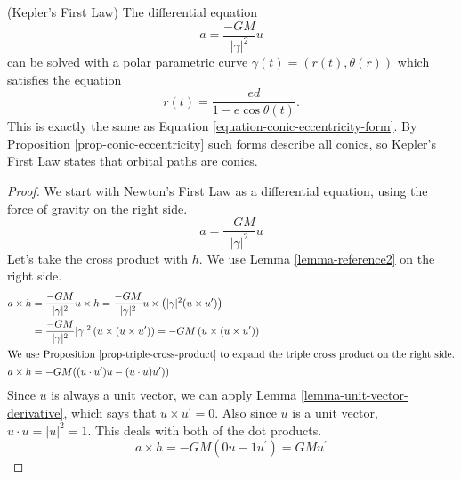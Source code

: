 \documentclass[fleqn,letterpaper]{report}
\begin{document}
\begin{prop}
(Kepler's First Law) The differential equation 
\begin{equation*}
a = \frac{-GM}{|\gamma|^2} u 
\end{equation*}
can be solved with a polar parametric curve $\gamma(t) =
(r(t),\theta(r))$ which satisfies the equation
\begin{equation*}
r(t) = \frac{ed}{1 - e \cos \theta(t)}.
\end{equation*}
This is exactly the same as Equation
\ref{equation-conic-eccentricity-form}. By Proposition
\ref{prop-conic-eccentricity} such forms describe all conics, so
Kepler's First Law states that orbital paths are conics. 
\end{prop}

\begin{proof}
We start with Newton's First Law as a differential equation,
using the force of gravity on the right side. 
\begin{equation*}
a = \frac{-GM}{|\gamma|^2} u 
\end{equation*}
Let's take the cross product with $h$. We use Lemma
\ref{lemma-reference2} on the right side.
\begin{align*}
a \times h & = \frac{-GM}{|\gamma|^2} u \times h 
= \frac{-GM}{|\gamma|^2} u \times \left( |\gamma|^2
(u \times u^\prime) \right) \\
& = \frac{-GM}{|\gamma|^2} |\gamma|^2 \left( u \times \left( u
\times u^\prime \right) \right) = -GM \left( u \times \left( u \times
u^\prime \right) \right) \\
\intertext{We use Proposition \ref{prop-triple-cross-product} to
expand the triple cross product on the right side.}
a \times h & = -GM ((u\cdot u^\prime) u - (u \cdot u) u^\prime)) 
\end{align*}
Since $u$ is always a unit vector, we can apply
Lemma \ref{lemma-unit-vector-derivative}, which says that 
$u \times u^\prime = 0$. Also since $u$ is a unit vector, $u
\cdot u = |u|^2 = 1$. This deals with both of the dot
products.
\begin{equation}
\label{equation-reference4}
a \times h = -GM ( 0 u - 1 u^\prime) = GM u^\prime
\end{equation}


\end{proof}
\end{document}
